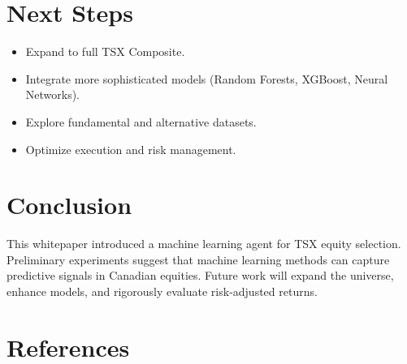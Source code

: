 \documentclass[11pt]{article}
\begin{document}
\section{Next Steps}
\begin{itemize}
    \item Expand to full TSX Composite.
    \item Integrate more sophisticated models (Random Forests, XGBoost, Neural Networks).
    \item Explore fundamental and alternative datasets.
    \item Optimize execution and risk management.
\end{itemize}

\section{Conclusion}
This whitepaper introduced a machine learning agent for TSX equity selection. Preliminary experiments suggest that machine learning methods can capture predictive signals in Canadian equities. Future work will expand the universe, enhance models, and rigorously evaluate risk-adjusted returns.

\section*{References}


\end{document}

